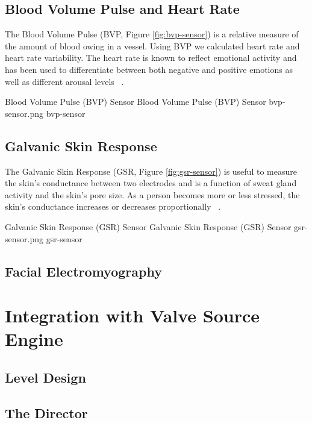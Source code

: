 \subsection{Blood Volume Pulse and Heart Rate}
The Blood Volume Pulse (BVP, Figure \ref{fig:bvp-sensor}) is a relative measure of the amount of blood owing in a vessel. Using BVP we calculated heart rate and heart rate variability. The heart rate is known to reflect emotional activity and has been used to differentiate between both negative and positive emotions as well as different arousal levels ~\cite{tt2013procomp}.

\img
{Blood Volume Pulse (BVP) Sensor}
{Blood Volume Pulse (BVP) Sensor}
{bvp-sensor.png}
{bvp-sensor}

\subsection{Galvanic Skin Response}
The Galvanic Skin Response (GSR, Figure \ref{fig:gsr-sensor}) is useful to measure the skin's conductance between two electrodes and is a function of sweat gland activity and the skin's pore size. As a person becomes more or less stressed, the skin's conductance increases or decreases proportionally ~\cite{picard2003affective}.

\img
{Galvanic Skin Response (GSR) Sensor}
{Galvanic Skin Response (GSR) Sensor}
{gsr-sensor.png}
{gsr-sensor}

\subsection{Facial Electromyography}


\section{Integration with Valve Source Engine}
\subsection{Level Design}
\subsection{The Director}
